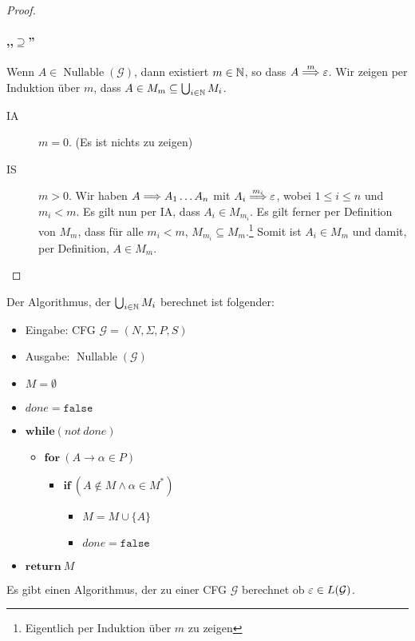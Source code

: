 \begin{proof}
  
  \paragraph{,,$\supseteq$''}
  Wenn $A \in \operatorname{Nullable}(\mathcal{G})$, dann existiert $m \in \mathbb{N}$, so dass $A \stackrel{m}{\==>} \Eps$.
  Wir zeigen per Induktion über $m$, dass $A \in M_m \subseteq \bigcup_{i \in \mathbb{N}} M_i$.
  \begin{description}
  \item[IA] $m = 0$.
    (Es ist nichts zu zeigen)
  \item[IS] $m > 0$.
    Wir haben $A \==> A_1\ldots A_n$ mit $A_i \stackrel{m_i}{\Longrightarrow} \varepsilon$, wobei $1 \le i \le n$ und $m_i < m$.
    Es gilt nun per IA, dass $A_i \in M_{m_i}$.
    Es gilt ferner per Definition von $M_m$, dass für alle $m_i < m$, $M_{m_i} \subseteq M_m$.\footnote{Eigentlich per Induktion über $m$ zu zeigen}
    Somit ist $A_i \in M_m$ und damit, per Definition, $A \in M_m$.
  \end{description}
\end{proof}
Der Algorithmus, der $\bigcup_{i \in \mathbb{N}} M_i$ berechnet ist folgender:
\begin{itemize}
\item Eingabe: CFG $\mathcal{G} = (N, \Sigma, P, S)$
\item Ausgabe: $\operatorname{Nullable}(\mathcal{G})$
\item[] $M = \emptyset$
\item[] $\mathit{done} = \mathtt{false}$
\item[] $\mathbf{while} (\mathit{not}~\mathit{done})$
  \begin{itemize}
  \item[] $\mathbf{for}~(A \to \alpha \in P)$
    \begin{itemize}
    \item[] $\mathbf{if}~(A \not \in M \land \alpha \in M^*)$
      \begin{itemize}
      \item[] $M = M \cup \{A \}$
      \item[] $\mathit{done} = \mathtt{false}$
      \end{itemize}
    \end{itemize}
  \end{itemize}
\item[] $\mathbf{return}~M$
\end{itemize}
\begin{Korollar}
  Es gibt einen Algorithmus, der zu einer CFG $\mathcal{G}$ berechnet ob $\varepsilon \in L(\mathcal{G})$.
\end{Korollar}
